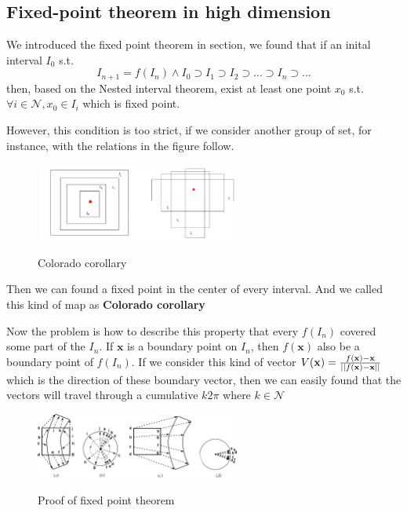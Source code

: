 \documentclass[12pt]{article}
\theoremstyle{plain}
\begin{document}
\subsection{Fixed-point theorem in high dimension}
We introduced the fixed point theorem in section, we found that if an inital interval $I_0$ s.t. 
$$
I_{n+1} = f(I_n) \land I_0 \supset I_1 \supset I_2 \supset \ldots \supset I_n \supset \ldots
$$
then, based on the Nested interval theorem, exist at least one point $x_0$ s.t. $\forall i \in \mathcal N, x_0 \in I_i$ which is fixed point. 

However, this condition is too strict, if we consider another group of set, for instance, with the relations in the figure follow.
\begin{figure}[H]
\begin{center}
\includegraphics[width=0.6\textwidth]{figure/section5/different-fixed-point-theo.png} \\
\end{center}
\caption{Colorado corollary}
\end{figure}

Then we can found a fixed point in the center of every interval. And we called this kind of map as \textbf{Colorado corollary}

Now the problem is how to describe this property that every $f(I_n)$ covered some part of the $I_n$. If $\mathbf x$ is a boundary point on $I_n$, then $f(\mathbf x)$ also be a boundary point of $f(I_n)$. If we consider this kind of vector $V(\mathbf x) = {f(\mathbf x) - \mathbf x \over ||f(\mathbf x) - \mathbf x||}$ which is the direction of these boundary vector, then we can easily found that the vectors will travel through a cumulative $k 2\pi$ where $k \in \mathcal N$


\begin{figure}[H]
\begin{center}
\includegraphics[width=0.6\textwidth]{figure/section5/fixed-point-theo-explain.png} \\
\end{center}
\caption{Proof of fixed point theorem}
\end{figure}
\end{document}
